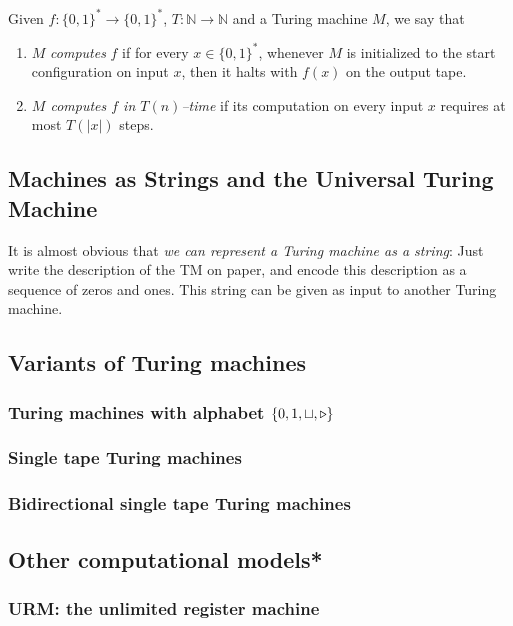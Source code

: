 \begin{df}
    Given $f \colon \{0,1\}^* \to \{0,1\}^*$, 
    $T \colon \mathbb{N} \to \mathbb{N}$ and a Turing machine $M$, we say that
    \begin{enumerate}[itemsep=5pt,parsep=5pt,leftmargin=3em,topsep=5pt,label=(\arabic*)] %
        \item $M$ \textit{computes} $f$ if for every $x \in \{0,1\}^*$, 
        whenever $M$ is initialized to the start configuration on input $x$, 
        then it halts with $f(x)$ on the output tape.

        \item 
        \textit{$M$ computes $f$ in $T(n)$--time} if its computation on every input $x$ requires at most $T(|x|)$ steps.
    \end{enumerate}
\end{df}




\subsection{Machines as Strings and the Universal Turing Machine}

It is almost obvious that \textit{we can represent a Turing machine as a string}: 
Just write the description of the TM on paper, 
and encode this description as a sequence of zeros and ones.
% 
This string can be given as input to another Turing machine.






\subsection{Variants of Turing machines}

\subsubsection{Turing machines with alphabet $\{0,1,\sqcup,\triangleright\}$}

\subsubsection{Single tape Turing machines}

\subsubsection{Bidirectional single tape Turing machines}







\subsection{Other  computational models*}



\subsubsection{URM: the unlimited register machine}


